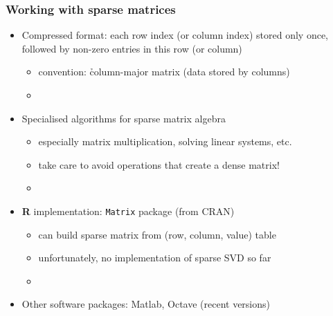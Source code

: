 \begin{frame}
  \frametitle{Working with sparse matrices}

  \begin{itemize}
  \item Compressed format: each row index (or column index) stored only once,
    followed by non-zero entries in this row (or column)%
    \begin{itemize}
    \item convention: \h{column-major} matrix (data stored by columns)
    \item[]
    \end{itemize}
    \pause
  \item Specialised algorithms for sparse matrix algebra
    \begin{itemize}
    \item especially matrix multiplication, solving linear systems, etc.
    \item take care to avoid operations that create a dense matrix!
    \item[]
    \end{itemize}
    \pause
  \item \textbf{R} implementation: \texttt{Matrix} package (from CRAN)
    \begin{itemize}
    \item can build sparse matrix from (row, column, value) table
    \item unfortunately, no implementation of sparse SVD so far
    \item[]
    \end{itemize}
    \pause
  \item Other software packages: Matlab, Octave (recent versions)
  \end{itemize}
\end{frame}

